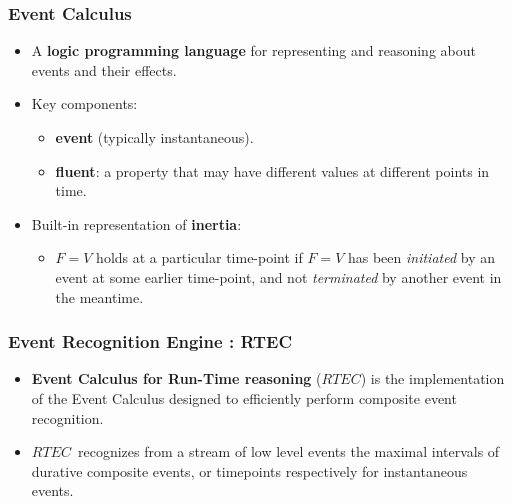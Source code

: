 \documentclass{beamer}
\def\rtec{$\mathit{RTEC}$}
\DeclareMathOperator{\val}{=}  %
\begin{document}
\begin{frame}
   \frametitle{Event Calculus}


\begin{itemize}
\item A \textbf{logic programming language} for representing and reasoning about events and their effects.
\pause
\item Key components:
\begin{itemize}
  \item \textbf{event} (typically instantaneous).
  \item \textbf{fluent}: a property that may have different values at different points in time.
\end{itemize}
\pause
\item Built-in representation of \textbf{inertia}:
\begin{itemize}
  \item $F \val V$ holds at a particular time-point if $F \val V$ has been \emph{initiated} by an event at some earlier time-point, and not \emph{terminated} by another event in the meantime.
\end{itemize}

\end{itemize}

\end{frame}


\begin{frame}[fragile]
\frametitle{Event Recognition Engine : RTEC}
\begin{itemize}
  
\item \textbf{Event Calculus for Run-Time reasoning} (\rtec) is the implementation of the Event Calculus designed to efficiently perform composite event recognition. 
\item \rtec\  recognizes from a stream of low level events the maximal intervals of durative composite events, or timepoints respectively for instantaneous events.
\end{itemize}
\end{frame}

\end{document}

